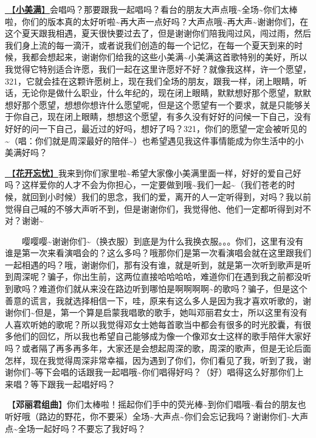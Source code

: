 \documentclass[]{ctexbook}
\begin{document}
\hyperref[happy-ending]{🎵【\textbf{小美满}】}会唱吗？那要跟我一起唱吗？看台的朋友大声点哦\textasciitilde 全场\textasciitilde 你们太棒啦，你们的版本真的太好听啦\textasciitilde 再大声一点好吗？大声点哦\textasciitilde 再大声\textasciitilde 谢谢你们，在这个夏天跟我相遇，夏天很快要过去了，但是谢谢你们陪我闯过风，闯过雨，然后我们身上流的每一滴汗，或者说我们创造的每一个记忆，在每一个夏天到来的时候，我都会想起来，谢谢你们给我的这些小美满\textasciitilde 小美满这首歌特别的美好，所以我觉得它特别适合许愿，我们一起在这里许愿好不好？就像我这样，许一个愿望，321，它就会挂在这颗许愿树上，现在我们全场的朋友，跟我一样，闭上眼睛，听话，无论你是做什么职业，什么年纪的，现在闭上眼睛，默默想好那个愿望，默默想好那个愿望，想想你想许什么愿望呢，但是这个愿望有一个要求，就是只能够关于你自己，现在闭上眼睛，想想这个愿望，有多久没有好好的问候一下自己，没有好好的问一下自己，最近过的好吗，想好了吗？321，你们的愿望一定会被听见的\textasciitilde（唱：你们就是周深最好的陪伴\textasciitilde）也希望遇见我这件事情能成为你生活中的小美满好吗？

\hyperref[no-worries]{🎵【\textbf{花开忘忧}】}我来到你们家里啦\textasciitilde 希望大家像小美满里面一样，好好的爱自己好吗？这样爱你的人才不会为你担心，一定要做到哦\textasciitilde 我们一起\textasciitilde（我们苍老的时候，就回到小时候）我们的思念，我们的爱，离开的人一定听得到，对吗？我以前觉得自己喊的不够大声听不到，但是谢谢你们，我觉得他、他们一定都听得到对不对？谢谢\textasciitilde{}

  嘤嘤嘤\textasciitilde 谢谢你们\textasciitilde（换衣服）到底是为什么我换衣服。。。你们，这里有没有谁是第一次来看演唱会的？这么多吗？哦那你们是第一次看演唱会就在这里跟我们一起相遇的吗？哦，谢谢你们，那有没有谁，就是听到，就是第一次听到歌声是听到周深呢？骗子，你出生前，这两位直接哈哈哈哈，难道你们在遇到我之前都没听到歌吗？难道你们就从来没在路边听到哪怕是啊啊啊啊\textasciitilde 的歌吗？骗子，但是这个善意的谎言，我就选择相信一下，哇，原来有这么多人是因为我才喜欢听歌的，谢谢你们\textasciitilde 但是，第一个算是启蒙我唱歌的歌手，她叫邓丽君女士，所以这里有没有人喜欢听她的歌呢？所以我觉得邓女士她每首歌当中都会有很多的时光胶囊，有很多他们的回忆，所以我也希望自己能够成为像一个像邓女士这样的歌手陪伴大家好吗？或者隔了再多再多年，大家还是会想起周深的歌，周深的歌声，但是无论后面怎样，现在我觉得周深非常幸福，因为遇到了你们，你们看见了我，听到了我，谢谢你们\textasciitilde 等下会唱的话跟我一起唱哦\textasciitilde 你们唱得好吗？（好）唱得这么好那你们上来唱？等下跟我一起唱好吗？

🎵【\textbf{邓丽君组曲}】你们太棒啦！摇起你们手中的荧光棒\textasciitilde 到你们唱哦\textasciitilde 看台的朋友也听好哦（路边的野花，你不要采）全场\textasciitilde 大声点\textasciitilde 你们会忘记我吗？谢谢你们\textasciitilde 大声点\textasciitilde 全场一起好吗？不要忘了我好吗？
\end{document}
